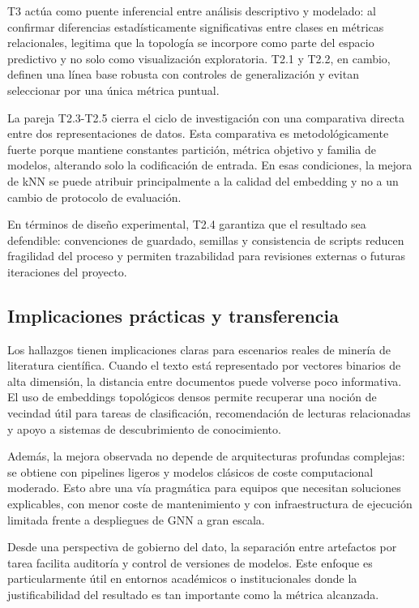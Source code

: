 \documentclass[conference,a4paper]{IEEEtran}
\begin{document}
T3 actúa como puente inferencial entre análisis descriptivo y modelado: al confirmar diferencias
estadísticamente significativas entre clases en métricas relacionales, legitima que la topología se
incorpore como parte del espacio predictivo y no solo como visualización exploratoria. T2.1 y T2.2,
en cambio, definen una línea base robusta con controles de generalización y evitan seleccionar por una
única métrica puntual.

La pareja T2.3-T2.5 cierra el ciclo de investigación con una comparativa directa entre dos
representaciones de datos. Esta comparativa es metodológicamente fuerte porque mantiene constantes
partición, métrica objetivo y familia de modelos, alterando solo la codificación de entrada. En esas
condiciones, la mejora de kNN se puede atribuir principalmente a la calidad del embedding y no a un
cambio de protocolo de evaluación.

En términos de diseño experimental, T2.4 garantiza que el resultado sea defendible: convenciones de
guardado, semillas y consistencia de scripts reducen fragilidad del proceso y permiten trazabilidad
para revisiones externas o futuras iteraciones del proyecto.

\subsection{Implicaciones prácticas y transferencia}

Los hallazgos tienen implicaciones claras para escenarios reales de minería de literatura científica.
Cuando el texto está representado por vectores binarios de alta dimensión, la distancia entre
documentos puede volverse poco informativa. El uso de embeddings topológicos densos permite recuperar
una noción de vecindad útil para tareas de clasificación, recomendación de lecturas relacionadas y
apoyo a sistemas de descubrimiento de conocimiento.

Además, la mejora observada no depende de arquitecturas profundas complejas: se obtiene con pipelines
ligeros y modelos clásicos de coste computacional moderado. Esto abre una vía pragmática para equipos
que necesitan soluciones explicables, con menor coste de mantenimiento y con infraestructura de
ejecución limitada frente a despliegues de GNN a gran escala.

Desde una perspectiva de gobierno del dato, la separación entre artefactos por tarea facilita auditoría
y control de versiones de modelos. Este enfoque es particularmente útil en entornos académicos o
institucionales donde la justificabilidad del resultado es tan importante como la métrica alcanzada.
\end{document}
